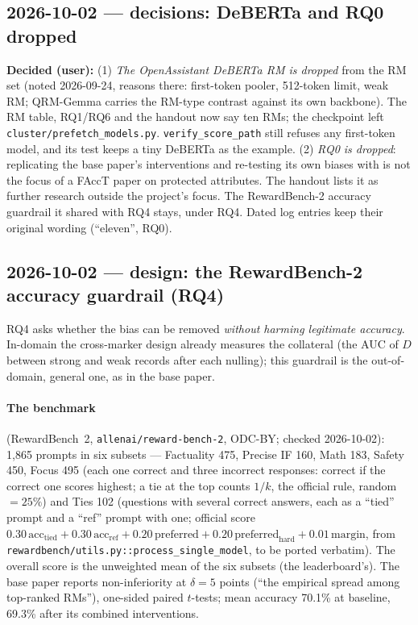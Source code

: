 \documentclass{article}
\begin{document}
\subsection*{2026-10-02 --- decisions: DeBERTa and RQ0 dropped}
\textbf{Decided (user):} (1) \emph{The OpenAssistant DeBERTa RM is dropped} from the RM set (noted 2026-09-24, reasons
there: first-token pooler, 512-token limit, weak RM; QRM-Gemma carries the RM-type contrast against its own backbone).
The RM table, RQ1/RQ6 and the handout now say ten RMs; the checkpoint left \texttt{cluster/prefetch\_models.py}.
\texttt{verify\_score\_path} still refuses any first-token model, and its test keeps a tiny DeBERTa as the example.
(2) \emph{RQ0 is dropped}: replicating the base paper's interventions and re-testing its own biases with \leace{} is
not the focus of a FAccT paper on protected attributes. The handout lists it as further research outside the
project's focus. The RewardBench-2 accuracy guardrail it shared with RQ4 stays, under RQ4. Dated log entries keep
their original wording (``eleven'', RQ0).

\subsection*{2026-10-02 --- design: the RewardBench-2 accuracy guardrail (RQ4)}
RQ4 asks whether the bias can be removed \emph{without harming legitimate accuracy}. In-domain the cross-marker design
already measures the collateral (the AUC of $D$ between strong and weak records after each nulling); this guardrail
is the out-of-domain, general one, as in the base paper.

\paragraph{The benchmark} (RewardBench~2, \texttt{allenai/reward-bench-2}, ODC-BY; checked 2026-10-02): 1{,}865
prompts in six subsets --- Factuality 475, Precise IF 160, Math 183, Safety 450, Focus 495 (each one correct and three
incorrect responses: correct if the correct one scores highest; a tie at the top counts $1/k$, the official rule,
random $=25\%$) and Ties 102 (questions with several correct answers, each as a ``tied'' prompt and a ``ref'' prompt
with one; official score $0.30\,\text{acc}_\text{tied} + 0.30\,\text{acc}_\text{ref} + 0.20\,\text{preferred} +
0.20\,\text{preferred}_\text{hard} + 0.01\,\text{margin}$, from \texttt{rewardbench/utils.py::process\_single\_model},
to be ported verbatim). The overall score is the unweighted mean of the six subsets (the leaderboard's). The base
paper \citep{fein2026onebias} reports non-inferiority at $\delta = 5$ points (``the empirical spread among top-ranked
RMs''), one-sided paired $t$-tests; mean accuracy 70.1\% at baseline, 69.3\% after its combined interventions.
\end{document}
